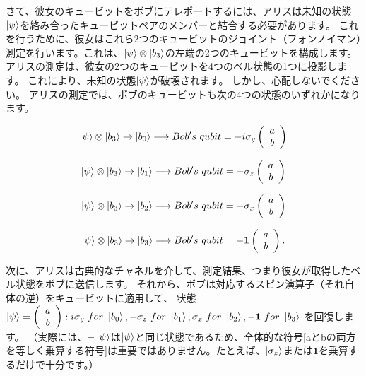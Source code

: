 さて、彼女のキュービットをボブにテレポートするには、アリスは未知の状態$\ket{\psi}$を絡み合ったキュービットペアのメンバーと結合する必要があります。
これを行うために、彼女はこれら2つのキュービットのジョイント（フォンノイマン）測定を行います。これは、$\ket{\psi} \otimes \ket{b_3}$の左端の2つのキュービットを構成します。
アリスの測定は、彼女の2つのキュービットを4つのベル状態の1つに投影します。 これにより、未知の状態$\ket{\psi}$が破壊されます。
しかし、心配しないでください。 アリスの測定では、ボブのキュービットも次の4つの状態のいずれかになります。

\begin{equation}
\label{193}
\ket{\psi} \otimes \ket{b_3}
\to
\ket{b_0}
\longrightarrow
Bob's \ qubit
=
-i \sigma_y 
\left( \begin{array}{c}
 a \\
 b
\end{array} \right) 
\end{equation}


\begin{equation}
\label{194}
\ket{\psi} \otimes \ket{b_3}
\to
\ket{b_1}
\longrightarrow
Bob's \ qubit
=
- \sigma_z
\left( \begin{array}{c}
 a \\
 b
\end{array} \right) 
\end{equation}

\begin{equation}
\label{195}
\ket{\psi} \otimes \ket{b_3}
\to
\ket{b_2}
\longrightarrow
Bob's \ qubit
=
- \sigma_x
\left( \begin{array}{c}
 a \\
 b
\end{array} \right) 
\end{equation}

\begin{equation}
\label{196}
\ket{\psi} \otimes \ket{b_3}
\to
\ket{b_3}
\longrightarrow
Bob's \ qubit
=
- \mathbf{1}
\left( \begin{array}{c}
 a \\
 b
\end{array} \right) .
\end{equation}

次に、アリスは古典的なチャネルを介して、測定結果、つまり彼女が取得したベル状態をボブに送信します。
それから、ボブは対応するスピン演算子（それ自体の逆）をキュービットに適用して、
状態
$\ket{\psi} =  
\left( \begin{array}{c}
 a \\
 b
\end{array} \right) 
:
i \sigma_y \ for \ \ket{b_0},
- \sigma_z \ for \ \ket{b_1},
\sigma_x \ for \ \ket{b_2},
- \mathbf{1}  \ for \ \ket{b_3}
$
を回復します。
（実際には、$- \ket{\psi}$は$\ket{\psi}$と同じ状態であるため、全体的な符号[aとbの両方を等しく乗算する符号]は重要ではありません。たとえば、$\ket{\sigma_z}$または$\mathbf{1}$を乗算するだけで十分です。）

